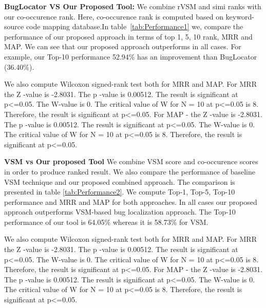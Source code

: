 \documentclass[conference]{IEEEtran}
\begin{document}
\textbf{BugLocator VS Our Proposed Tool:}
We combine rVSM and simi ranks with our co-occurence rank. Here, co-occurence rank is computed based on keyword-source code mapping database.In table~\ref{tab:Performance1} we, compare the performance of our proposed approach in terms of top 1, 5, 10 rank, MRR and MAP. We can see that our proposed approach outperforms in all cases. For example, our Top-10 performance 52.94\% has an improvement than BugLocator (36.40\%).

We also compute Wilcoxon signed-rank test both for MRR and MAP. For MRR the {Z} -value is -2.8031. The {p} -value is 0.00512. The result is significant at p<=0.05. The W-value is 0. The critical value of W for N = 10 at p<=0.05 is 8. Therefore, the result is significant at p<=0.05.
For MAP - the {Z} -value is -2.8031. The {p} -value is 0.00512. The result is significant at p<=0.05. The W-value is 0. The critical value of W for N = 10 at p<=0.05 is 8. Therefore, the result is significant at p<=0.05.


\textbf{VSM vs Our proposed Tool}
We combine VSM score and co-occurence scores in order to produce ranked result. We also compare the performance of baseline VSM technique and our proposed combined approach. The comparison is presented in table \ref{tab:Performance2}. We compute Top-1, Top-5, Top-10 performance and MRR and MAP for both approaches. In all cases our proposed approach outperforms VSM-based bug localization approach. The Top-10 performance of our tool is 64.05\% whereas it is 58.73\% for VSM.

We also compute Wilcoxon signed-rank test both for MRR and MAP. For MRR the {Z} -value is -2.8031. The {p} -value is 0.00512. The result is significant at p<=0.05. The W-value is 0. The critical value of W for N = 10 at p<=0.05 is 8. Therefore, the result is significant at p<=0.05.
For MAP - the {Z} -value is -2.8031. The {p} -value is 0.00512. The result is significant at p<=0.05. The W-value is 0. The critical value of W for N = 10 at p<=0.05 is 8. Therefore, the result is significant at p<=0.05.
\end{document}
